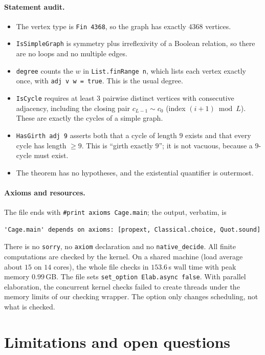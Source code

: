 \documentclass[11pt]{article}
\numberwithin{equation}{section}
\theoremstyle{definition}
\theoremstyle{remark}
\begin{document}
\paragraph{Statement audit.}
\begin{itemize}
\item The vertex type is \texttt{Fin 4368}, so the graph has exactly $4368$ vertices.
\item \texttt{IsSimpleGraph} is symmetry plus irreflexivity of a Boolean relation, so there are no
  loops and no multiple edges.
\item \texttt{degree} counts the $w$ in \texttt{List.finRange n}, which lists each vertex exactly
  once, with \texttt{adj v w = true}. This is the usual degree.
\item \texttt{IsCycle} requires at least $3$ pairwise distinct vertices with consecutive adjacency,
  including the closing pair $c_{L-1}\sim c_0$ (index $(i+1)\bmod L$). These are exactly the
  cycles of a simple graph.
\item \texttt{HasGirth adj 9} asserts both that a cycle of length $9$ exists and that every cycle
  has length $\ge 9$. This is ``girth exactly $9$''; it is not vacuous, because a $9$-cycle must
  exist.
\item The theorem has no hypotheses, and the existential quantifier is outermost.
\end{itemize}

\paragraph{Axioms and resources.}
The file ends with \verb|#print axioms Cage.main|; the output, verbatim, is
\begin{Verbatim}[fontsize=\footnotesize,frame=single]
'Cage.main' depends on axioms: [propext, Classical.choice, Quot.sound]
\end{Verbatim}
There is no \texttt{sorry}, no \texttt{axiom} declaration and no \texttt{native\_decide}. All
finite computations are checked by the kernel. On a shared machine (load average about $15$ on
$14$ cores), the whole file checks in $153.6$\,s wall time with peak memory $0.99$\,GB.
The file sets \verb|set_option Elab.async false|. With parallel elaboration, the concurrent
kernel checks failed to create threads under the memory limits of our checking wrapper. The
option only changes scheduling, not what is checked.

\section{Limitations and open questions}\label{sec:limits}
\end{document}
